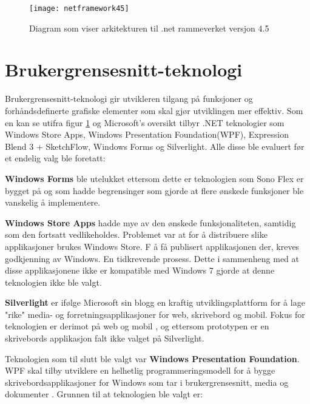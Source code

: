  
\begin{figure}[ht] 
\centering 
\texttt{[image: netframework45]} 
\caption{Diagram som viser arkitekturen til .net rammeverket versjon 4.5} 
\label{fig:net-arkitektur} 
\end{figure} 
 
 
\section{Brukergrensesnitt-teknologi} 

Brukergrensesnitt-teknologi gir utvikleren tilgang på funksjoner og forhåndsdefinerte grafiske elementer som skal gjør utviklingen mer effektiv. Som en kan se utifra figur \ref{fig:net-arkitektur} og Microsoft's oversikt \cite{User1111:online} tilbyr .NET teknologier som Windows Store Apps, Windows Presentation Foundation(\gls{WPF}), Expression Blend 3 + SketchFlow, Windows Forms og Silverlight. Alle disse ble evaluert før et endelig valg ble foretatt:

\textbf{Windows Forms} ble utelukket ettersom dette er teknologien som Sono Flex er bygget på og som hadde begrensinger som gjorde at flere ønskede funksjoner ble vanskelig å implementere. 

\textbf{Windows Store Apps} hadde mye av den ønskede funksjonaliteten, samtidig som den fortsatt vedlikeholdes. Problemet var at for å distribuere slike applikasjoner brukes Windows Store. F å få publisert applikasjonen der, kreves godkjenning av Windows. En tidkrevende prosess. Dette i sammenheng med at disse applikasjonene ikke er kompatible med Windows 7\cite{Windo0:online} gjorde at denne teknologien ikke ble valgt. 

\textbf{Silverlight} er ifølge Microsoft sin blogg\cite{User1111:online} en kraftig utviklingsplattform for å lage "rike" media- og forretningsapplikasjoner for web, skrivebord og mobil. Fokus for teknologien er derimot på web og mobil \cite{Micro6:online}, og ettersom prototypen er en skrivebords applikasjon falt ikke valget på Silverlight.

Teknologien som til slutt ble valgt var \textbf{Windows Presentation Foundation}. WPF skal tilby utviklere en helhetlig programmeringsmodell for å bygge skrivebordsapplikasjoner for Windows som tar i brukergrensesnitt, media og dokumenter \cite{Windo777:online}. Grunnen til at teknologien ble valgt er:


